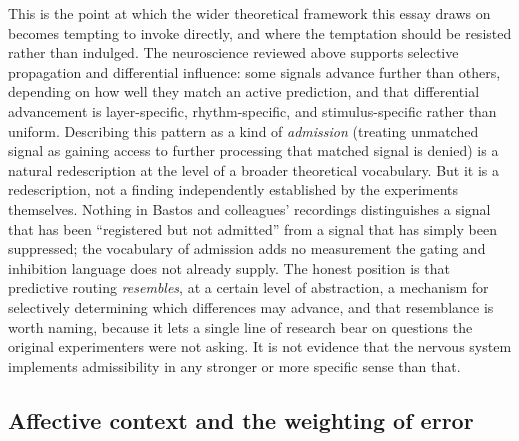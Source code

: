 \documentclass[11pt]{article}
\begin{document}
This is the point at which the wider theoretical framework this essay draws on becomes tempting to invoke directly, and where the temptation should be resisted rather than indulged. The neuroscience reviewed above supports selective propagation and differential influence: some signals advance further than others, depending on how well they match an active prediction, and that differential advancement is layer-specific, rhythm-specific, and stimulus-specific rather than uniform. Describing this pattern as a kind of \emph{admission} (treating unmatched signal as gaining access to further processing that matched signal is denied) is a natural redescription at the level of a broader theoretical vocabulary. But it is a redescription, not a finding independently established by the experiments themselves. Nothing in Bastos and colleagues' recordings distinguishes a signal that has been ``registered but not admitted'' from a signal that has simply been suppressed; the vocabulary of admission adds no measurement the gating and inhibition language does not already supply. The honest position is that predictive routing \emph{resembles}, at a certain level of abstraction, a mechanism for selectively determining which differences may advance, and that resemblance is worth naming, because it lets a single line of research bear on questions the original experimenters were not asking. It is not evidence that the nervous system implements admissibility in any stronger or more specific sense than that.

\subsection{Affective context and the weighting of error}
\end{document}
